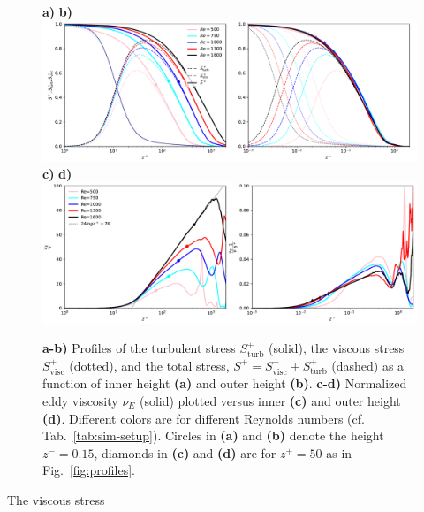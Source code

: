 \documentclass[a4paper,11pt]{amsart}
\begin{document}
\begin{figure}
  \begin{flushleft} 
    \textbf{a)}\hspace{0.47\textwidth} \textbf{b)}\\
    \includegraphics[width=\textwidth]{../plot/stresses.pdf}
    \textbf{c)}\hspace{0.47\textwidth} \textbf{d)}\\    
    \includegraphics[width=\textwidth]{../plot/eddy_viscosity.pdf}\\
  \end{flushleft} 
  \caption{
    \textbf{a-b)} Profiles of
    the turbulent stress $S_\mathrm{turb}^+$ (solid), 
    the viscous stress  $S_\mathrm{visc}^+$ (dotted), 
    and the total stress, $S^+=S_\mathrm{visc}^++S_\mathrm{turb}^+$ (dashed)
    as a function of inner height \textbf{(a)} and outer height \textbf{(b)}. 
    \textbf{c-d)} Normalized eddy viscosity $\nu_E$ (solid) plotted versus
    inner \textbf{(c)} and outer height \textbf{(d)}.
    Different colors are for different Reynolds numbers (cf. Tab.~\ref{tab:sim-setup}).
    Circles in \textbf{(a)} and \textbf{(b)} denote the height
    $z^-=0.15$, diamonds in \textbf{(c)} and \textbf{(d)} are for $z^+=50$
    as in Fig.~\ref{fig:profiles}.
    \label{fig:stresses}}  
\end{figure} 
The viscous stress
%
\end{document}
